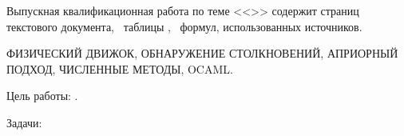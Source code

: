 
Выпускная квалификационная работа по теме <<\Topic>> содержит
\pageref{LastPage} \TODO страниц текстового документа,
\totaltables~таблицы \TODO,
\totalequations~формул,
 использованных источников.

\MakeUppercase{
    физический движок,
    обнаружение столкновений,
    априорный подход,
    численные методы,
    OCaml.
}

Цель работы: \Target.

Задачи:

\Tasks
